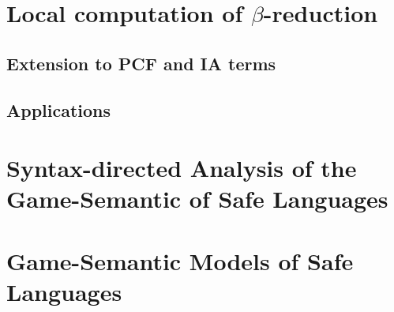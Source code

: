 \chapter{Local computation of $\beta$-reduction}

          


    \section{Extension to PCF and IA terms}
    \section{Applications}




\chapter{Syntax-directed Analysis of the Game-Semantic of Safe Languages}
    


\chapter{Game-Semantic Models of Safe Languages}


    



